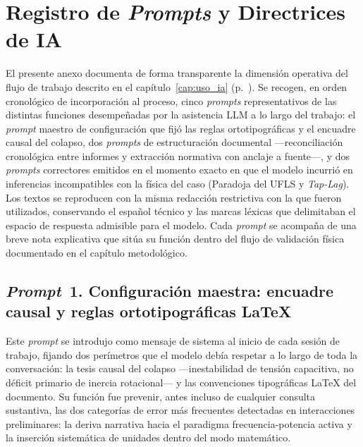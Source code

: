 
\chapter{Registro de \textit{Prompts} y Directrices de IA}
\label{app:prompts}

El presente anexo documenta de forma transparente la dimensión operativa del
flujo de trabajo descrito en el capítulo~\ref{cap:uso_ia}
(p.~\pageref{cap:uso_ia}). Se recogen, en orden cronológico de incorporación
al proceso, cinco \textit{prompts} representativos de las distintas
funciones desempeñadas por la asistencia LLM a lo largo del trabajo: el
\textit{prompt} maestro de configuración que fijó las reglas
ortotipográficas y el encuadre causal del colapso, dos \textit{prompts} de
estructuración documental ---reconciliación cronológica entre informes y
extracción normativa con anclaje a fuente---, y dos \textit{prompts}
correctores emitidos en el momento exacto en que el modelo incurrió en
inferencias incompatibles con la física del caso (Paradoja del UFLS y
\textit{Tap-Lag}). Los textos se reproducen con la misma redacción
restrictiva con la que fueron utilizados, conservando el español técnico y
las marcas léxicas que delimitaban el espacio de respuesta admisible para
el modelo. Cada \textit{prompt} se acompaña de una breve nota explicativa
que sitúa su función dentro del flujo de validación física documentado en
el capítulo metodológico.

\section*{\textit{Prompt}~1. Configuración maestra: encuadre causal y
reglas ortotipográficas LaTeX}
\label{prompt:maestro}

Este \textit{prompt} se introdujo como mensaje de sistema al inicio de
cada sesión de trabajo, fijando dos perímetros que el modelo debía
respetar a lo largo de toda la conversación: la tesis causal del colapso
---inestabilidad de tensión capacitiva, no déficit primario de inercia
rotacional--- y las convenciones tipográficas LaTeX del documento. Su
función fue prevenir, antes incluso de cualquier consulta sustantiva, las
dos categorías de error más frecuentes detectadas en interacciones
preliminares: la deriva narrativa hacia el paradigma frecuencia-potencia
activa y la inserción sistemática de unidades dentro del modo matemático.


